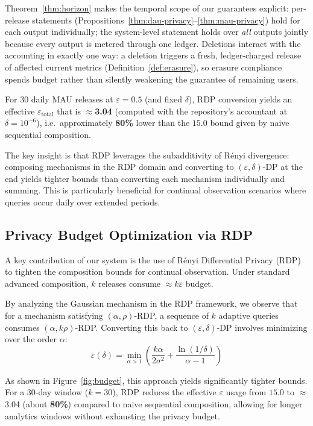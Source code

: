 \documentclass[sigconf,anonymous,review]{acmart}
\begin{document}
Theorem~\ref{thm:horizon} makes the temporal scope of our guarantees explicit: per-release statements (Propositions~\ref{thm:dau-privacy}--\ref{thm:mau-privacy}) hold for each output individually; the system-level statement holds over \emph{all} outputs jointly because every output is metered through one ledger. Deletions interact with the accounting in exactly one way: a deletion triggers a fresh, ledger-charged release of affected current metrics (Definition~\ref{def:erasure}), so erasure compliance spends budget rather than silently weakening the guarantee of remaining users.

For 30 daily MAU releases at $\varepsilon = 0.5$ (and fixed $\delta$), RDP conversion yields an effective $\varepsilon_{\text{total}}$ that is $\approx$\textbf{3.04} (computed with the repository's accountant at $\delta = 10^{-6}$), i.e.\ approximately \textbf{80\%} lower than the $15.0$ bound given by naive sequential composition.

The key insight is that RDP leverages the subadditivity of Rényi divergence: composing mechanisms in the RDP domain and converting to $(\varepsilon, \delta)$-DP at the end yields tighter bounds than converting each mechanism individually and summing. This is particularly beneficial for continual observation scenarios where queries occur daily over extended periods.

\subsection{Privacy Budget Optimization via RDP}

A key contribution of our system is the use of Rényi Differential Privacy (RDP) to tighten the composition bounds for continual observation. Under standard advanced composition, $k$ releases consume $\approx k\varepsilon$ budget.

By analyzing the Gaussian mechanism in the RDP framework, we observe that for a mechanism satisfying $(\alpha, \rho)$-RDP, a sequence of $k$ adaptive queries consumes $(\alpha, k\rho)$-RDP. Converting this back to $(\varepsilon, \delta)$-DP involves minimizing over the order $\alpha$:
\[
    \varepsilon(\delta) = \min_{\alpha>1} \left( \frac{k\alpha}{2\sigma^2} + \frac{\ln(1/\delta)}{\alpha-1} \right)
\]

As shown in Figure~\ref{fig:budget}, this approach yields significantly tighter bounds. For a 30-day window ($k=30$), RDP reduces the effective $\varepsilon$ usage from $15.0$ to $\approx$3.04 (about \textbf{80\%}) compared to naive sequential composition, allowing for longer analytics windows without exhausting the privacy budget.
\end{document}
